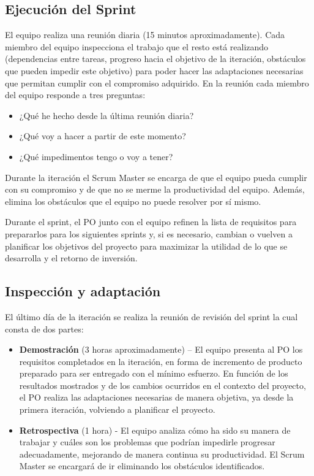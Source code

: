 \subsection{Ejecución del Sprint}
El equipo realiza una reunión diaria (15 minutos aproximadamente). Cada miembro del equipo inspecciona el trabajo que el resto está realizando (dependencias entre tareas, progreso hacia el objetivo de la iteración, obstáculos que pueden impedir este objetivo) para poder hacer las adaptaciones necesarias que permitan cumplir con el compromiso adquirido. En la reunión cada miembro del equipo responde a tres preguntas:
\begin{itemize}
    \item ¿Qué he hecho desde la última reunión diaria?
    \item ¿Qué voy a hacer a partir de este momento?
    \item ¿Qué impedimentos tengo o voy a tener?
\end{itemize}
Durante la iteración el Scrum Master se encarga de que el equipo pueda cumplir con su compromiso y de que no se merme la productividad del equipo. Además, elimina los obstáculos que el equipo no puede resolver por sí mismo.

Durante el sprint, el PO junto con el equipo refinen la lista de requisitos para prepararlos para los siguientes sprints y, si es necesario, cambian o vuelven a planificar los objetivos del proyecto para maximizar la utilidad de lo que se desarrolla y el retorno de inversión.

\subsection{Inspección y adaptación}
El último día de la iteración se realiza la reunión de revisión del sprint la cual consta de dos partes:
\begin{itemize}
    \item \textbf{Demostración} (3 horas aproximadamente) – El equipo presenta al PO los requisitos completados en la iteración, en forma de incremento de producto preparado para ser entregado con el mínimo esfuerzo. En función de los resultados mostrados y de los cambios ocurridos en el contexto del proyecto, el PO realiza las adaptaciones necesarias de manera objetiva, ya desde la primera iteración, volviendo a planificar el proyecto.
    \item \textbf{Retrospectiva} (1 hora) - El equipo analiza cómo ha sido su manera de trabajar y cuáles son los problemas que podrían impedirle progresar adecuadamente, mejorando de manera continua su productividad. El Scrum Master se encargará de ir eliminando los obstáculos identificados.
\end{itemize}